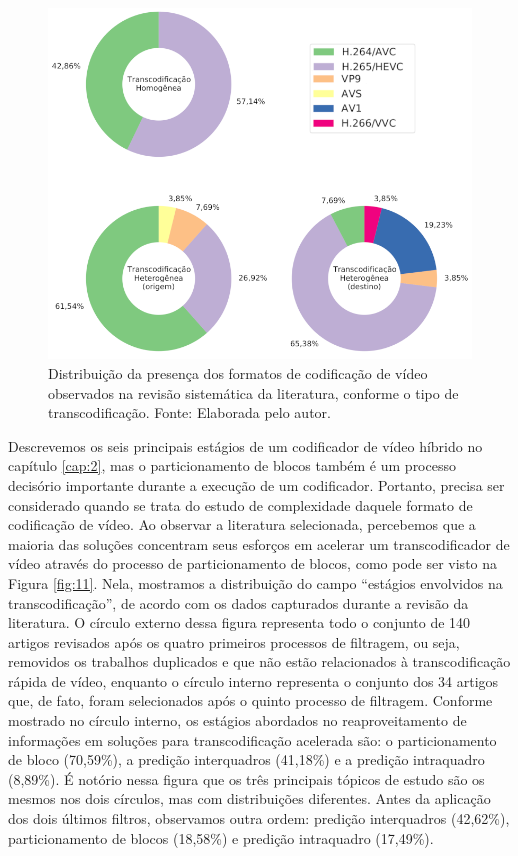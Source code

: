 \begin{figure}
    \centering
    \includegraphics[width=\textwidth]{FIGURES/fig_10.png}
    \caption{Distribuição da presença dos formatos de codificação de vídeo observados na revisão sistemática da literatura, conforme o tipo de transcodificação. Fonte: Elaborada pelo autor.}
    \label{fig:10}
\end{figure}

Descrevemos os seis principais estágios de um codificador de vídeo híbrido no capítulo \ref{cap:2}, mas o particionamento de blocos também é um processo decisório importante durante a execução de um codificador. Portanto, precisa ser considerado quando se trata do estudo de complexidade daquele formato de codificação de vídeo. Ao observar a literatura selecionada, percebemos que a maioria das soluções concentram seus esforços em acelerar um transcodificador de vídeo através do processo de particionamento de blocos, como pode ser visto na Figura \ref{fig:11}. Nela, mostramos a distribuição do campo ``estágios envolvidos na transcodificação'', de acordo com os dados capturados durante a revisão da literatura. O círculo externo dessa figura representa todo o conjunto de 140 artigos revisados após os quatro primeiros processos de filtragem, ou seja, removidos os trabalhos duplicados e que não estão relacionados à transcodificação rápida de vídeo, enquanto o círculo interno representa o conjunto dos 34 artigos que, de fato, foram selecionados após o quinto processo de filtragem. Conforme mostrado no círculo interno, os estágios abordados no reaproveitamento de informações em soluções para transcodificação acelerada são: o particionamento de bloco (70,59\%), a predição interquadros (41,18\%) e a predição intraquadro (8,89\%). É notório nessa figura que os três principais tópicos de estudo são os mesmos nos dois círculos, mas com distribuições diferentes. Antes da aplicação dos dois últimos filtros, observamos outra ordem: predição interquadros (42,62\%), particionamento de blocos (18,58\%) e predição intraquadro (17,49\%).

